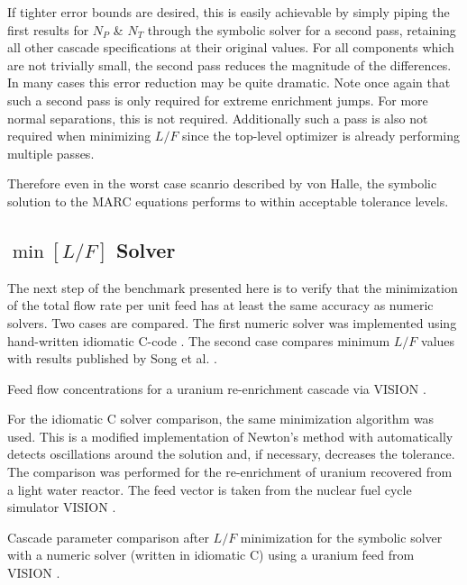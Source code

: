 \documentclass[preprint,12pt]{elsarticle}
\begin{document}
If tighter error bounds are desired, this is easily achievable by simply piping
the first results for $N_P$ \& $N_T$ through the symbolic solver for a second pass, 
retaining all other cascade specifications at their original values.  For all 
components which are not trivially small, the second pass reduces the magnitude of the 
differences.  In many cases this error reduction may be quite dramatic. Note once 
again that such a second 
pass is only required for extreme enrichment jumps.  For more normal separations, 
this is not required.  Additionally such a pass is also not required when minimizing
$L/F$ since the top-level optimizer is already performing multiple passes.

Therefore even in the worst case scanrio described by von Halle, the symbolic 
solution to the MARC equations performs to within acceptable tolerance levels.


\subsection{$\min\left[L/F\right]$ Solver}
\label{sec:minl-solver}

The next step of the benchmark presented here is to verify that the minimization
of the total flow rate per unit feed has at least the same accuracy as 
numeric solvers.  Two cases are compared.  The first numeric solver was implemented 
using hand-written idiomatic C-code \cite{pyne:enrichment}.  The second case compares
minimum $L/F$ values with results published by Song et al. 
\cite{doi:10.1080/01496391003793884}.

\begin{table}[htbp]
\begin{center}
\caption{Feed flow concentrations for a uranium re-enrichment cascade via  
    VISION \cite{Jacobson2009}.}

\label{feed_vision}
\end{center}
\end{table}

For the idiomatic C solver comparison, the same minimization algorithm was used.  
This is a modified implementation of Newton's method with automatically detects 
oscillations around the solution and, if necessary, decreases the tolerance.
The comparison was performed for the re-enrichment of  uranium recovered from 
a light water reactor.  The feed vector is taken from the
nuclear fuel cycle simulator VISION \cite{Jacobson2009}.

\begin{table}[htbp]
\begin{center}
\caption{Cascade parameter comparison after $L/F$ minimization for the symbolic 
    solver with a numeric solver (written in idiomatic C) using a uranium feed from 
    VISION \cite{Jacobson2009}.}

\label{casc_compare_vision}
\end{center}
\end{table}
\end{document}
